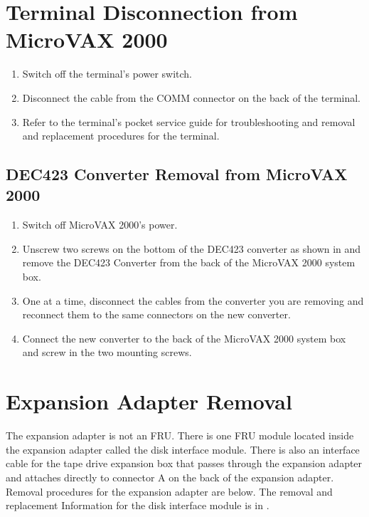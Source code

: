 \section{ Terminal Disconnection from MicroVAX 2000}
\begin{enumerate}
\item	Switch off the terminal's power switch.
\item	Disconnect the cable from the COMM connector on the back of the terminal.
\item	Refer to the terminal's pocket service guide for troubleshooting and
		removal and replacement procedures for the terminal.
\end{enumerate}

\subsection{DEC423 Converter Removal from MicroVAX 2000}
\begin{enumerate}
\item	Switch off MicroVAX 2000's power.
\item	Unscrew two screws on the bottom of the DEC423 converter as shown
		in  and remove the DEC423 Converter from the back of the
		MicroVAX 2000 system box.
\newpage
\item	One at a time, disconnect the cables from the converter you are 
		removing and reconnect them to the same connectors on the new converter.
\item	Connect the new converter to the back of the MicroVAX 2000 system
		box and screw in the two mounting screws.
\end{enumerate}

\section{Expansion Adapter Removal}

The expansion adapter is not an FRU. There is one FRU module located
inside the expansion adapter called the disk interface module. There is
also an interface cable for the tape drive expansion box that passes through
the expansion adapter and attaches directly to connector A on the back
of the expansion adapter. Removal procedures for the expansion adapter
are below. The removal and replacement Information for the disk interface
module is in .

